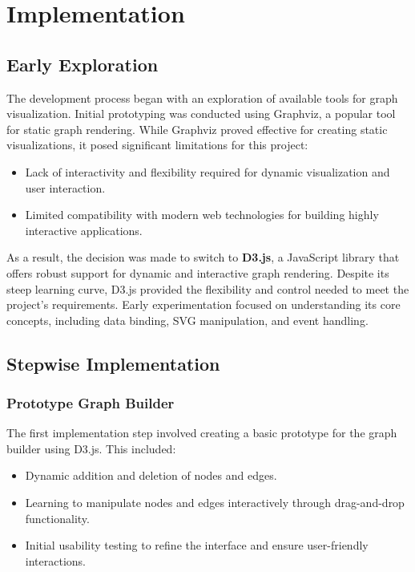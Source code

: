\section{Implementation}
\label{sec:implementation}

\subsection{Early Exploration}
The development process began with an exploration of available tools for graph visualization. Initial prototyping was conducted using Graphviz, a popular tool for static graph rendering. While Graphviz proved effective for creating static visualizations, it posed significant limitations for this project:
\begin{itemize}
    \item Lack of interactivity and flexibility required for dynamic visualization and user interaction.
    \item Limited compatibility with modern web technologies for building highly interactive applications.
\end{itemize}
As a result, the decision was made to switch to \textbf{D3.js}, a JavaScript library that offers robust support for dynamic and interactive graph rendering. Despite its steep learning curve, D3.js provided the flexibility and control needed to meet the project’s requirements. Early experimentation focused on understanding its core concepts, including data binding, SVG manipulation, and event handling.

\subsection{Stepwise Implementation}

\subsubsection{Prototype Graph Builder}
The first implementation step involved creating a basic prototype for the graph builder using D3.js. This included:
\begin{itemize}
    \item Dynamic addition and deletion of nodes and edges.
    \item Learning to manipulate nodes and edges interactively through drag-and-drop functionality.
    \item Initial usability testing to refine the interface and ensure user-friendly interactions.
\end{itemize}

